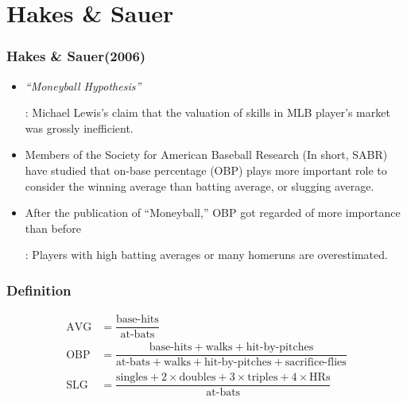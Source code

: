 \documentclass[dvipdfmx,12pt]{beamer}
\begin{document}
\section{Hakes \& Sauer}
\begin{frame}\frametitle{Hakes \& Sauer(2006)}

 \begin{itemize}
 \item \textit{``Moneyball Hypothesis''}
 
 : Michael Lewis's claim that the valuation of skills in MLB player's market was grossly inefficient.
 
 \item Members of the Society for American Baseball Research (In short, SABR) have studied that
 on-base percentage (OBP) plays more important role to consider the winning average than batting average, or slugging average.
 
 \item After the publication of ``Moneyball,'' OBP got regarded of more importance than before 
 
 : Players with high batting averages or many homeruns are overestimated.
 
 \end{itemize}

\end{frame}

\begin{frame}\frametitle{Definition}

\begin{align*}
\text{AVG} &= \dfrac{\text{base-hits}}{\text{at-bats}} \\
\text{OBP} &= \dfrac{\text{base-hits} + \text{walks} + \text{hit-by-pitches}} 
{\text{at-bats} + \text{walks} + \text{hit-by-pitches} + \text{sacrifice-flies}} \\
\text{SLG} &= \dfrac{\text{singles} + 2 \times \text{doubles} + 3 \times \text{triples} + 4 \times \text{HRs}}
{\text{at-bats}}
\end{align*}

\end{frame}
\end{document}
